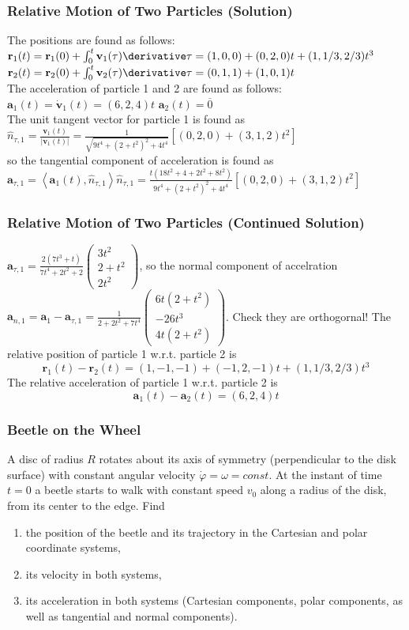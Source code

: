 \begin{frame}
\frametitle{Relative Motion of Two Particles (Solution)}
The \alert{positions} are found as follows:\\
$\mathbf{r}_1(t)=\mathbf{r}_1(0)+\int_0^t\mathbf{v}_1(\tau)\derivative\tau=(1,0,0)+(0,2,0)t+(1,1/3,2/3)t^3$\\
$\mathbf{r}_2(t)=\mathbf{r}_2(0)+\int_0^t\mathbf{v}_2(\tau)\derivative\tau=(0,1,1)+(1,0,1)t$\\
The \alert{acceleration} of particle 1 and 2 are found as follows:\\
$\mathbf{a}_1(t)=\dot{\mathbf{v}}_1(t)=(6,2,4)t$ \quad $\mathbf{a}_2(t)=\overline{0}$\\
The \alert{unit tangent vector} for particle 1 is found as $\hat{n}_{\tau,1}=\frac{\mathbf{v}_1(t)}{|\mathbf{v}_1(t)|}=\frac{1}{\sqrt{9t^4+(2+t^2)^2+4t^4}}[(0,2,0)+(3,1,2)t^2]$
\\
so the \alert{tangential component} of acceleration is found as
$\mathbf{a}_{\tau,1}=\left<\mathbf{a}_1(t),\hat{n}_{\tau,1}\right>\hat{n}_{\tau,1}=\frac{t(18t^2+4+2t^2+8t^2)}{9t^4+(2+t^2)^2+4t^4}[(0,2,0)+(3,1,2)t^2]$
\end{frame}
\begin{frame}
\frametitle{Relative Motion of Two Particles (Continued Solution)}
$\mathbf{a}_{\tau,1}=\frac{2 \left(7 t^3+t\right)}{7 t^4+2 t^2+2}\left(\begin{matrix}3t^2\\2+t^2\\2t^2\end{matrix}\right)$, so the \alert{normal component of accelration} $\mathbf{a}_{n,1}=\mathbf{a}_1-\mathbf{a}_{\tau,1}=\frac{1}{2+2t^2+7t^4}\left(\begin{matrix}6t(2+t^2)\\-26t^3\\4t(2+t^2)\end{matrix}\right)$. Check they are orthogornal!
The \alert{relative position} of particle 1 w.r.t. particle 2 is
\[
\mathbf{r}_1(t)-\mathbf{r}_2(t)=(1,-1,-1)+(-1,2,-1)t+(1,1/3,2/3)t^3
\]
The \alert{relative acceleration} of particle 1 w.r.t. particle 2 is
\[
\mathbf{a}_1(t)-\mathbf{a}_2(t)=(6,2,4)t
\]
\end{frame}
\begin{frame}
\frametitle{Beetle on the Wheel}
A disc of radius $R$ rotates about its axis of symmetry (perpendicular to the disk surface) with \alert{constant angular velocity} $\dot\varphi=\omega=const$. At the instant of time $t=0$ a beetle starts to walk with \alert{constant speed} $v_0$ \alert{along a radius} of the disk, from its center to the edge. Find
\begin{enumerate}
\item{the \alert{position} of the beetle and its \alert{trajectory} in the Cartesian and polar coordinate systems,}
\item{its \alert{velocity} in both systems,}
\item{its \alert{acceleration} in both systems (Cartesian components, polar components, as well as tangential and normal components).}
\end{enumerate}
\end{frame}
